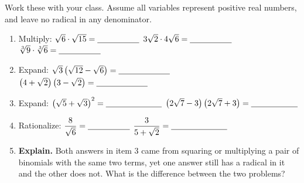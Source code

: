 \documentclass[10pt]{article}
\begin{document}
\begin{practicebox}
Work these with your class. Assume all variables represent positive real numbers, and leave no
radical in any denominator.
\begin{enumerate}[leftmargin=1.7em, itemsep=5pt]
  \item Multiply: \; $\sqrt{6}\cdot\sqrt{15}=\blank{1.8cm}$ \quad
        $3\sqrt2\cdot4\sqrt{6}=\blank{1.8cm}$ \quad $\sqrt[3]{9}\cdot\sqrt[3]{6}=\blank{1.8cm}$
  \item Expand: \; $\sqrt3\left(\sqrt{12}-\sqrt6\right)=\blank{2.2cm}$ \quad
        $\left(4+\sqrt2\right)\left(3-\sqrt2\right)=\blank{2.2cm}$
  \item Expand: \; $\left(\sqrt5+\sqrt3\right)^{2}=\blank{2.4cm}$ \quad
        $\left(2\sqrt7-3\right)\left(2\sqrt7+3\right)=\blank{2.0cm}$
  \item Rationalize: \; $\dfrac{8}{\sqrt6}=\blank{1.8cm}$ \quad
        $\dfrac{3}{5+\sqrt2}=\blank{2.4cm}$
  \item \textbf{Explain.} Both answers in item 3 came from squaring or multiplying a pair of
        binomials with the same two terms, yet one answer still has a radical in it and the other
        does not. What is the difference between the two problems? 
\end{enumerate}
\end{practicebox}
\end{document}
